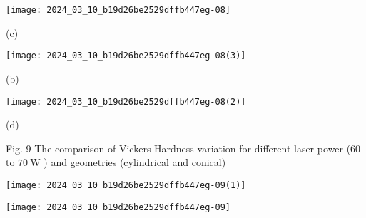 \documentclass[10pt]{article}
\begin{document}
\begin{center}
\texttt{[image: 2024\_03\_10\_b19d26be2529dffb447eg-08]}
\end{center}

(c)

\begin{center}
\texttt{[image: 2024\_03\_10\_b19d26be2529dffb447eg-08(3)]}
\end{center}

(b)

\begin{center}
\texttt{[image: 2024\_03\_10\_b19d26be2529dffb447eg-08(2)]}
\end{center}

(d)

Fig. 9 The comparison of Vickers Hardness variation for different laser power (60 to $70 \mathrm{~W}$ ) and geometries (cylindrical and conical)

\begin{center}
\texttt{[image: 2024\_03\_10\_b19d26be2529dffb447eg-09(1)]}
\end{center}

\begin{center}
\texttt{[image: 2024\_03\_10\_b19d26be2529dffb447eg-09]}
\end{center}
\end{document}
